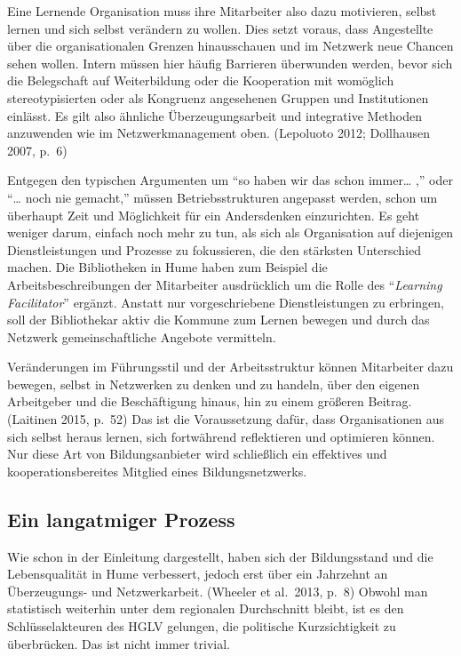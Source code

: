 \documentclass[a4paper,
fontsize=11pt,
oneside,
numbers=noperiodatend,
parskip=half-,
bibliography=totoc,
final
]{scrartcl}
\begin{document}
Eine Lernende Organisation muss ihre Mitarbeiter also dazu motivieren,
selbst lernen und sich selbst verändern zu wollen. Dies setzt voraus,
dass Angestellte über die organisationalen Grenzen hinausschauen und im
Netzwerk neue Chancen sehen wollen. Intern müssen hier häufig Barrieren
überwunden werden, bevor sich die Belegschaft auf Weiterbildung oder die
Kooperation mit womöglich stereotypisierten oder als Kongruenz
angesehenen Gruppen und Institutionen einlässt. Es gilt also ähnliche
Überzeugungsarbeit und integrative Methoden anzuwenden wie im
Netzwerkmanagement oben. (Lepoluoto 2012; Dollhausen 2007, p.~6)

Entgegen den typischen Argumenten um \enquote{so haben wir das schon
immer\ldots{} ‚} oder \enquote{\ldots{} noch nie gemacht,} müssen
Betriebsstrukturen angepasst werden, schon um überhaupt Zeit und
Möglichkeit für ein Andersdenken einzurichten. Es geht weniger darum,
einfach noch mehr zu tun, als sich als Organisation auf diejenigen
Dienstleistungen und Prozesse zu fokussieren, die den stärksten
Unterschied machen. Die Bibliotheken in Hume haben zum Beispiel die
Arbeitsbeschreibungen der Mitarbeiter ausdrücklich um die Rolle des
\enquote{\emph{Learning Facilitator}} ergänzt. Anstatt nur
vorgeschriebene Dienstleistungen zu erbringen, soll der Bibliothekar
aktiv die Kommune zum Lernen bewegen und durch das Netzwerk
gemeinschaftliche Angebote vermitteln.

Veränderungen im Führungsstil und der Arbeitsstruktur können Mitarbeiter
dazu bewegen, selbst in Netzwerken zu denken und zu handeln, über den
eigenen Arbeitgeber und die Beschäftigung hinaus, hin zu einem größeren
Beitrag. (Laitinen 2015, p.~52) Das ist die Voraussetzung dafür, dass
Organisationen aus sich selbst heraus lernen, sich fortwährend
reflektieren und optimieren können. Nur diese Art von Bildungsanbieter
wird schließlich ein effektives und kooperationsbereites Mitglied eines
Bildungsnetzwerks.

\hypertarget{ein-langatmiger-prozess}{%
\subsection*{Ein langatmiger Prozess}\label{ein-langatmiger-prozess}}

Wie schon in der Einleitung dargestellt, haben sich der Bildungsstand
und die Lebensqualität in Hume verbessert, jedoch erst über ein
Jahrzehnt an Überzeugungs- und Netzwerkarbeit. (Wheeler et al.~2013,
p.~8) Obwohl man statistisch weiterhin unter dem regionalen Durchschnitt
bleibt, ist es den Schlüsselakteuren des HGLV gelungen, die politische
Kurzsichtigkeit zu überbrücken. Das ist nicht immer trivial.
\end{document}
